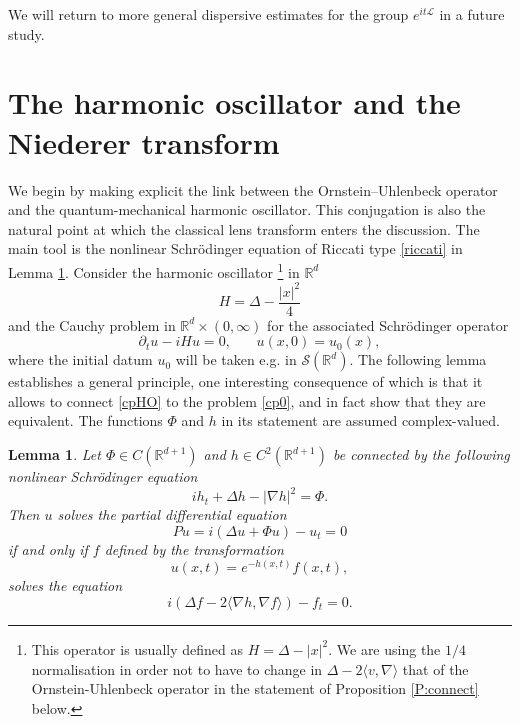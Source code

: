 \documentclass[11pt,a4paper]{amsart}
\def \R {\mathbb{R}}
\newcommand{\Rm}{\mathbb R^d}
\newcommand{\p}{\partial}
\numberwithin{equation}{section}
\newcommand{\sa}{\langle}
\newcommand{\da}{\rangle}
\newtheorem{lemma}[theorem]{Lemma}
\numberwithin{equation}{section}
\begin{document}
We will  return to more general dispersive estimates for the group $e^{it\mathscr L}$ in a future study. 
 


\section{The harmonic oscillator and the Niederer transform}\label{S:app}

We begin by making explicit the link between the Ornstein--Uhlenbeck operator and the quantum-mechanical harmonic oscillator.  This conjugation is also the natural point at which the classical lens transform enters the discussion. The main tool is the nonlinear Schr\"odinger equation of Riccati type \eqref{riccati} in Lemma \ref{L:ouho}. Consider the harmonic oscillator \footnote{This operator is usually defined as $H = \Delta - |x|^2$. We are using the $1/4$ normalisation in order not to have to change in $\Delta - 2 \sa v,\nabla\da$ that of the Ornstein-Uhlenbeck operator in the statement of Proposition \ref{P:connect} below.}  in $\Rm$
\begin{equation}\label{H}
H = \Delta - \frac{|x|^2}4
\end{equation}
and the Cauchy problem in $\Rm\times (0,\infty)$ for the associated Schr\"odinger operator
\begin{equation}\label{cpHO}
\p_t u - i H u = 0,\ \ \ \ \ \ \ \ u(x,0) = u_0(x),
\end{equation}
where the initial datum $u_0$ will be taken e.g. in $\mathscr S(\Rm)$. 
The following lemma establishes a general principle, one interesting consequence of which is that it allows to connect \eqref{cpHO} to the problem \eqref{cp0}, and in fact show that they are equivalent. The functions $\Phi$ and $h$ in its statement are assumed complex-valued.

\begin{lemma}\label{L:ouho}
Let $\Phi\in C(\R^{d+1})$ and $h\in C^2(\R^{d+1})$ be connected by the following  nonlinear Schr\"odinger equation
\begin{equation}\label{riccati}
i h_t + \Delta h - |\nabla h|^2  = \Phi.
\end{equation}
Then $u$ solves the partial differential equation
\begin{equation}\label{pdeho}
P u = i(\Delta u + \Phi u) - u_t = 0
\end{equation}
if and only if $f$ defined by the transformation
\begin{equation}\label{genexp}
u(x,t) = e^{-h(x,t)} f(x,t),
\end{equation} 
solves the equation
\begin{equation}\label{PDEou}
i(\Delta f - 2 \langle\nabla h,\nabla f\rangle) - f_t = 0.
\end{equation}
\end{lemma}
\end{document}
